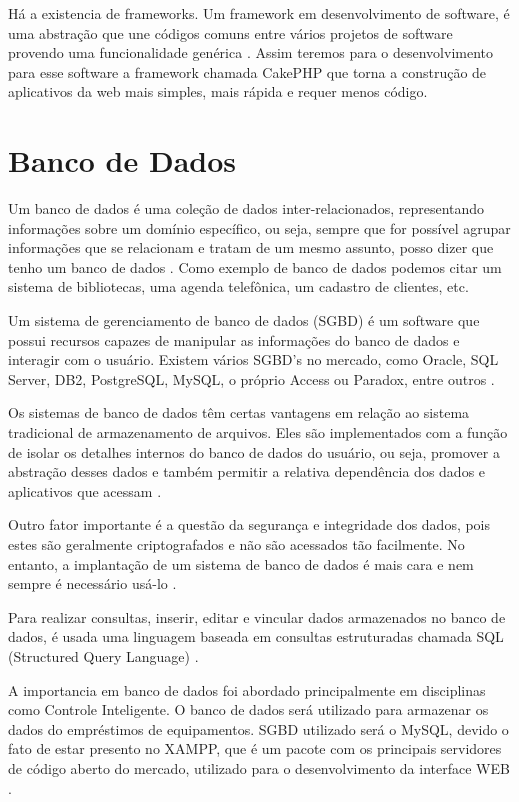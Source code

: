 Há a existencia de frameworks. Um framework em desenvolvimento de software, é uma abstração que une códigos comuns entre vários projetos de software provendo uma funcionalidade genérica \cite{WEB3}. Assim teremos para o desenvolvimento para esse software a framework chamada CakePHP \cite{Cake} que  torna a construção de aplicativos da web mais simples, mais rápida e requer menos código. 

\section[Banco de Dados]{Banco de Dados}
Um banco de dados é uma coleção de dados inter-relacionados, representando informações sobre um domínio específico, ou seja, sempre que for possível agrupar informações que se relacionam e tratam de um mesmo assunto, posso dizer que tenho um banco de dados \cite{BD1}. Como exemplo de banco de dados podemos citar um sistema de bibliotecas, uma agenda telefônica, um cadastro de clientes, etc.

Um sistema de gerenciamento de banco de dados (SGBD) é um software que possui recursos capazes de manipular as informações do banco de dados e interagir com o usuário. Existem vários SGBD’s no mercado, como Oracle, SQL Server, DB2, PostgreSQL, MySQL, o próprio Access ou Paradox, entre outros \cite{BD1}.

Os sistemas de banco de dados têm certas vantagens em relação ao sistema tradicional de armazenamento de arquivos. Eles são implementados com a função de isolar os detalhes internos do banco de dados do usuário, ou seja, promover a abstração desses dados e também permitir a relativa dependência dos dados e aplicativos que acessam \cite{BD1}.

Outro fator importante é a questão da segurança e integridade dos dados, pois estes são geralmente criptografados e não são acessados tão facilmente. No entanto, a implantação de um sistema de banco de dados é mais cara e nem sempre é necessário usá-lo \cite{BD1}.

Para realizar consultas, inserir, editar e vincular dados armazenados no banco de dados, é usada uma linguagem baseada em consultas estruturadas chamada SQL (Structured Query Language) \cite{BD1}.

A importancia em banco de dados foi abordado principalmente em disciplinas como Controle Inteligente. O banco de dados será  utilizado para armazenar os dados do empréstimos de equipamentos. SGBD utilizado será o MySQL, devido o fato de estar presento no XAMPP, que é um pacote com os principais servidores de código aberto do mercado, utilizado para o desenvolvimento da interface WEB \cite{BD2}.

